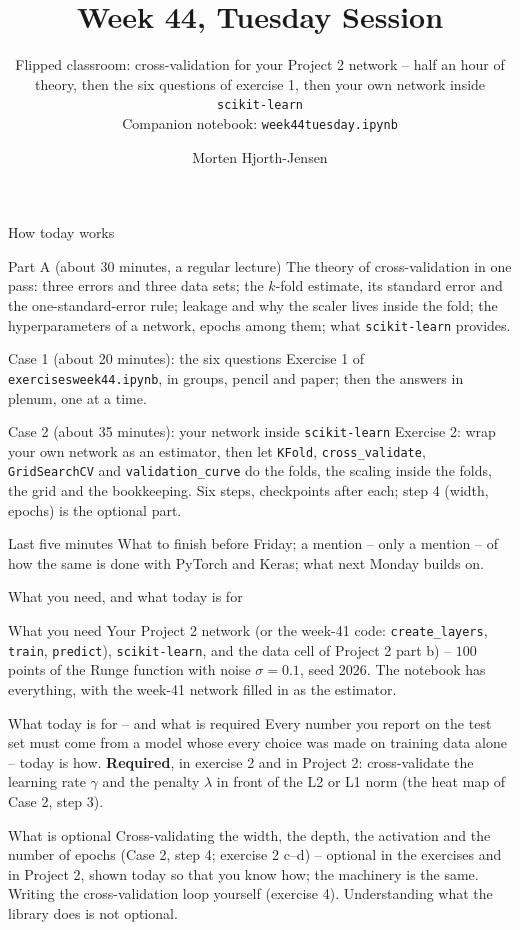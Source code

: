\documentclass[10pt,aspectratio=169]{beamer}
\title{Week 44, Tuesday Session}
\subtitle{Flipped classroom: cross-validation for your Project 2 network --
  half an hour of theory, then the six questions of exercise 1, then your
  own network inside \texttt{scikit-learn}\\[3pt]
  \small Companion notebook: \texttt{week44tuesday.ipynb}}
\author{Morten Hjorth-Jensen}
\institute{Department of Physics and Center for Computing in Science Education,\\
  University of Oslo, Norway}
\date{}
\begin{document}
\begin{frame}
\titlepage
\end{frame}

\begin{frame}{How today works}
\small
\begin{block}{Part A (about 30 minutes, a regular lecture)}
The theory of cross-validation in one pass: three errors and three data
sets; the $k$-fold estimate, its standard error and the one-standard-error
rule; leakage and why the scaler lives inside the fold; the hyperparameters
of a network, epochs among them; what \texttt{scikit-learn} provides.
\end{block}
\begin{block}{Case 1 (about 20 minutes): the six questions}
Exercise 1 of \texttt{exercisesweek44.ipynb}, in groups, pencil and paper;
then the answers in plenum, one at a time.
\end{block}
\begin{block}{Case 2 (about 35 minutes): your network inside \texttt{scikit-learn}}
Exercise 2: wrap your own network as an estimator, then let \texttt{KFold},
\texttt{cross\_validate}, \texttt{GridSearchCV} and
\texttt{validation\_curve} do the folds, the scaling inside the folds, the
grid and the bookkeeping.  Six steps, checkpoints after each; step 4
(width, epochs) is the optional part.
\end{block}
\begin{block}{Last five minutes}
What to finish before Friday; a mention -- only a mention -- of how the
same is done with PyTorch and Keras; what next Monday builds on.
\end{block}
\end{frame}

\begin{frame}{What you need, and what today is for}
\small
\begin{block}{What you need}
Your Project 2 network (or the week-41 code: \texttt{create\_layers},
\texttt{train}, \texttt{predict}), \texttt{scikit-learn}, and the data cell
of Project 2 part b) -- $100$ points of the Runge function with noise
$\sigma=0.1$, seed $2026$.  The notebook has everything, with the week-41
network filled in as the estimator.
\end{block}
\begin{block}{What today is for -- and what is required}
Every number you report on the test set must come from a model whose every
choice was made on training data alone -- today is how.  \textbf{Required},
in exercise 2 and in Project 2: cross-validate the learning rate $\gamma$
and the penalty $\lambda$ in front of the L2 or L1 norm (the heat map of
Case 2, step 3).
\end{block}
\begin{block}{What is optional}
Cross-validating the width, the depth, the activation and the number of
epochs (Case 2, step 4; exercise 2 c--d) -- optional in the exercises and in
Project 2, shown today so that you know how; the machinery is the same.
Writing the cross-validation loop yourself (exercise 4).  Understanding
what the library does is not optional.
\end{block}
\end{frame}
\end{document}
